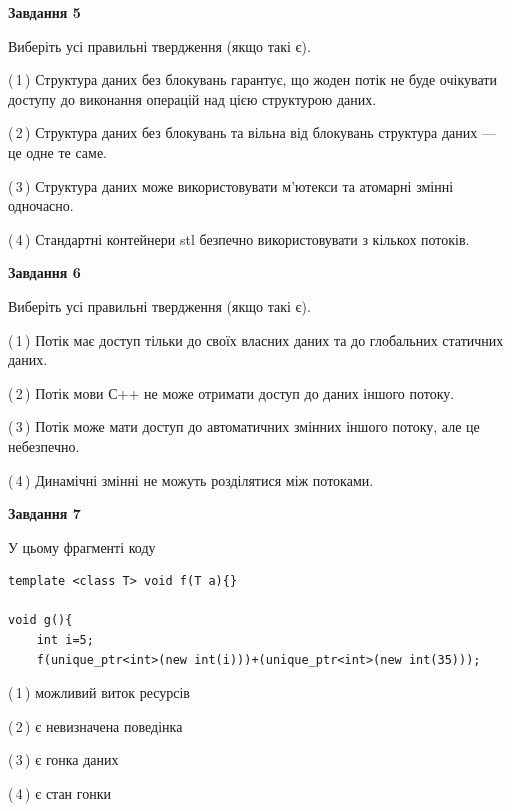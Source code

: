 \documentclass[12pt, ukrainian]{article}
\begin{document}
\begin {large}
{\begin{center}
\textbf{Завдання 5}
\end{center}

Виберіть усі правильні твердження (якщо такі є).\par
\vspace{2mm}

(\,1\,) Структура даних без блокувань гарантує, що жоден потік не буде очікувати доступу до виконання операцій над цією структурою даних.%

(\,2\,) Структура даних без блокувань та вільна від блокувань структура даних --- це одне те саме.%

(\,3\,) Структура даних може використовувати м’ютекси та атомарні змінні одночасно.%

(\,4\,) Стандартні контейнери stl безпечно використовувати з кількох потоків.%
\newpage


\begin{center}
\textbf{Завдання 6}
\end{center}

Виберіть усі правильні твердження (якщо такі є).\par
\vspace{2mm}

(\,1\,) Потік має доступ тільки до своїх власних даних та до глобальних статичних даних.%

(\,2\,) Потік мови С++ не може отримати доступ до даних іншого потоку.%

(\,3\,) Потік може мати доступ до автоматичних змінних іншого потоку, але це небезпечно.%

(\,4\,) Динамічні змінні не можуть розділятися між потоками.%


\begin{center}
\textbf{Завдання 7}
\end{center}

У цьому фрагменті коду
\begin{verbatim}
template <class T> void f(T a){}

void g(){
    int i=5;
    f(unique_ptr<int>(new int(i)))+(unique_ptr<int>(new int(35)));
\end{verbatim}
(\,1\,) можливий виток ресурсів%

(\,2\,) є невизначена поведінка%

(\,3\,) є гонка даних%

(\,4\,) є стан гонки%

}
\end {large}

\vspace{4mm}
\newpage
\end{document}
